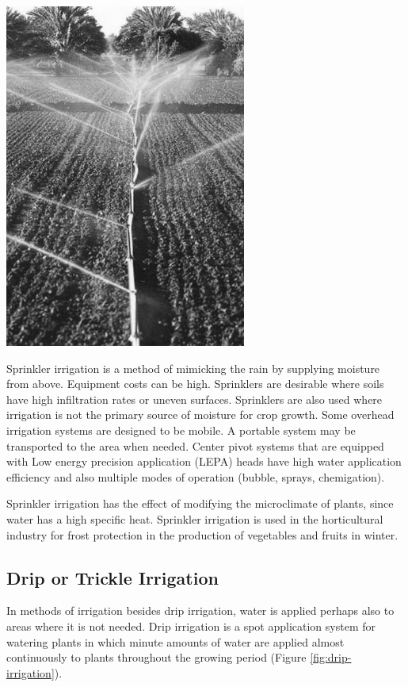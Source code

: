 \documentclass[
]{article}
\begin{document}
\includegraphics[width=0.65\linewidth]{../images/irrigation/Sprinkler_irrigation}

Sprinkler irrigation is a method of mimicking the rain by supplying moisture from above. Equipment costs can be high. Sprinklers are desirable where soils have high infiltration rates or uneven surfaces. Sprinklers are also used where irrigation is not the primary source of moisture for crop growth. Some overhead irrigation systems are designed to be mobile. A portable system may be transported to the area when needed. Center pivot systems that are equipped with Low energy precision application (LEPA) heads have high water application efficiency and also multiple modes of operation (bubble, sprays, chemigation).

Sprinkler irrigation has the effect of modifying the microclimate of plants, since water has a high specific heat. Sprinkler irrigation is used in the horticultural industry for frost protection in the production of vegetables and fruits in winter.

\hypertarget{drip-or-trickle-irrigation}{%
\subsection{Drip or Trickle Irrigation}\label{drip-or-trickle-irrigation}}

In methods of irrigation besides drip irrigation, water is applied perhaps also to areas where it is not needed. Drip irrigation is a spot application system for watering plants in which minute amounts of water are applied almost continuously to plants throughout the growing period (Figure \ref{fig:drip-irrigation}).
\end{document}

